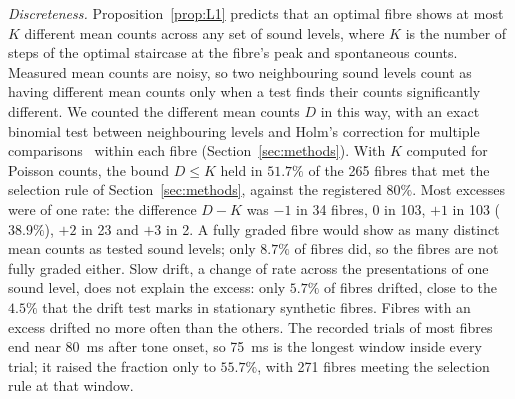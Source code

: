 \emph{Discreteness.} Proposition~\ref{prop:L1} predicts that an optimal fibre shows at most $K$ different mean counts across any set of
sound levels, where $K$ is the number of steps of the optimal staircase at the fibre's peak and spontaneous counts. Measured
mean counts are noisy, so two neighbouring sound levels count as having different mean counts only when a test finds their counts
significantly different. We counted the different mean counts $D$ in this way, with an exact binomial test between neighbouring levels
and Holm's correction for multiple comparisons~\cite{Holm1979} within each fibre (Section~\ref{sec:methods}). With $K$ computed for Poisson counts,
the bound $D\le K$ held in $51.7\%$ of the 265 fibres that met the selection rule of Section~\ref{sec:methods}, against the
registered $80\%$. Most excesses were of one rate: the difference
$D-K$ was $-1$ in 34 fibres, $0$ in 103, $+1$ in 103 ($38.9\%$), $+2$ in 23 and $+3$ in 2. A fully graded fibre would show as many distinct mean counts as tested sound
levels; only $8.7\%$ of fibres did, so the fibres are not fully graded either. Slow drift, a change of rate across the presentations
of one sound level, does not explain the excess: only $5.7\%$ of fibres drifted, close to the $4.5\%$ that the drift test marks in stationary synthetic fibres. Fibres with
an excess drifted no more often than the others. The recorded trials of most fibres end near 80~ms after tone onset, so 75~ms is the
longest window inside every trial; it raised the fraction only to $55.7\%$, with 271 fibres meeting the selection rule at that
window.

